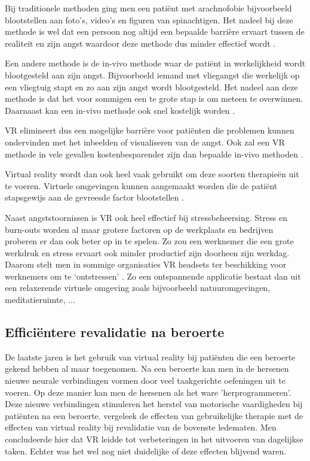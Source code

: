 Bij traditionele methoden ging men een patiënt met arachnofobie bijvoorbeeld blootstellen aan foto’s, video’s en figuren van spinachtigen. Het nadeel bij deze methode is wel dat een persoon nog altijd een bepaalde barrière ervaart tussen de realiteit en zijn angst waardoor deze methode dus minder effectief wordt \autocite{Keller2018}.

Een andere methode is de in-vivo methode waar de patiënt in werkelijkheid wordt blootgesteld aan zijn angst. Bijvoorbeeld iemand met vliegangst die werkelijk op een vliegtuig stapt en zo aan zijn angst wordt blootgesteld. Het nadeel aan deze methode is dat het voor sommigen een te grote stap is om meteen te overwinnen. Daarnaast kan een in-vivo methode ook snel kostelijk worden \autocite{Keller2018}.

VR elimineert dus een mogelijke barrière voor patiënten die problemen kunnen ondervinden met het inbeelden of visualiseren van de angst. Ook zal een VR methode in vele gevallen kostenbesparender zijn dan bepaalde in-vivo methoden \autocite{Keller2018}.

Virtual reality wordt dan ook heel vaak gebruikt om deze soorten therapieën uit te voeren. Virtuele omgevingen kunnen aangemaakt worden die de patiënt stapsgewijs aan de gevreesde factor blootstellen \autocite{Keller2018}.

Naast angststoornissen is VR ook heel effectief bij stressbeheersing. Stress en burn-outs worden al maar grotere factoren op de werkplaats en bedrijven proberen er dan ook beter op in te spelen. Zo zou een werknemer die een grote werkdruk en stress ervaart ook minder productief zijn doorheen zijn werkdag. Daarom stelt men in sommige organisaties VR headsets ter beschikking voor werknemers om te ‘ontstressen’ \autocite{Thoondee2017}.  
Zo een ontspannende applicatie bestaat dan uit een relaxerende virtuele omgeving zoals bijvoorbeeld natuuromgevingen, meditatieruimte, ...

\subsection{Efficiëntere revalidatie na beroerte}  
De laatste jaren is het gebruik van virtual reality bij patiënten die een beroerte gekend hebben al maar toegenomen. Na een beroerte kan men in de hersenen nieuwe neurale verbindingen vormen door veel taakgerichte oefeningen uit te voeren. Op deze manier kan men de hersenen als het ware 'herprogrammeren'. Deze nieuwe verbindingen stimuleren het herstel van motorische vaardigheden bij patiënten na een beroerte. \textcite{Laver2017} vergeleek de effecten van gebruikelijke therapie met de effecten van virtual reality bij revalidatie van de bovenste ledematen. Men concludeerde hier dat VR leidde tot verbeteringen in het uitvoeren van dagelijkse taken. Echter was het wel nog niet duidelijke of deze effecten blijvend waren.

